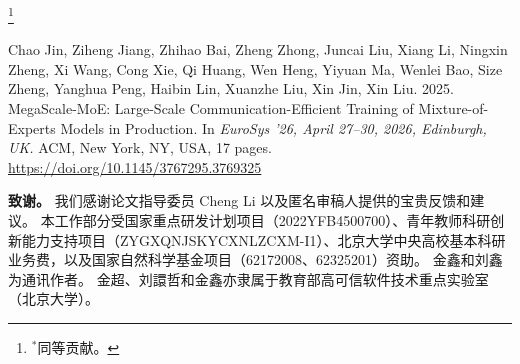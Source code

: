 \documentclass[sigplan,twocolumn]{acmart}
\newcommand{\parabf}[1]{\medskip\noindent\textbf{#1}}
\newcommand{\sysname}{MegaScale-MoE\xspace}
\begin{document}
\renewcommand{\shortauthors}{C. Jin, et al}
\renewcommand{\shorttitle}{\sysname：大规模通信高效训练}
\begin{sloppypar}


\maketitle
{\let\thefootnote\relax\footnote{{$^*$同等贡献。}}}

\vspace{-6pt}
{\par\smallskip\small{}\par\nobreak
  \noindent Chao Jin, Ziheng Jiang, Zhihao Bai, Zheng Zhong, Juncai Liu, Xiang Li, Ningxin Zheng, Xi Wang, Cong Xie, Qi Huang, Wen Heng, Yiyuan Ma, Wenlei Bao, Size Zheng, Yanghua Peng, Haibin Lin, Xuanzhe Liu, Xin Jin, Xin Liu. 2025. MegaScale-MoE: Large-Scale Communication-Efficient Training of Mixture-of-Experts Models in Production. 
  In \textit{EuroSys ’26, April
27–30, 2026, Edinburgh, UK.} ACM, New York, NY, USA, 17 pages. 
\url{https://doi.org/10.1145/3767295.3769325}
}



% 

% 





\parabf{致谢。}
我们感谢论文指导委员 Cheng Li 以及匿名审稿人提供的宝贵反馈和建议。
本工作部分受国家重点研发计划项目（2022YFB4500700）、青年教师科研创新能力支持项目（ZYGXQNJSKYCXNLZCXM-I1）、北京大学中央高校基本科研业务费，以及国家自然科学基金项目（62172008、62325201）资助。
金鑫和刘鑫为通讯作者。
金超、刘譞哲和金鑫亦隶属于教育部高可信软件技术重点实验室（北京大学）。

\label{lastpage}

\def\UrlBreaks{\do\/\do-}



\clearpage

\balance


\end{sloppypar}
\end{document}
